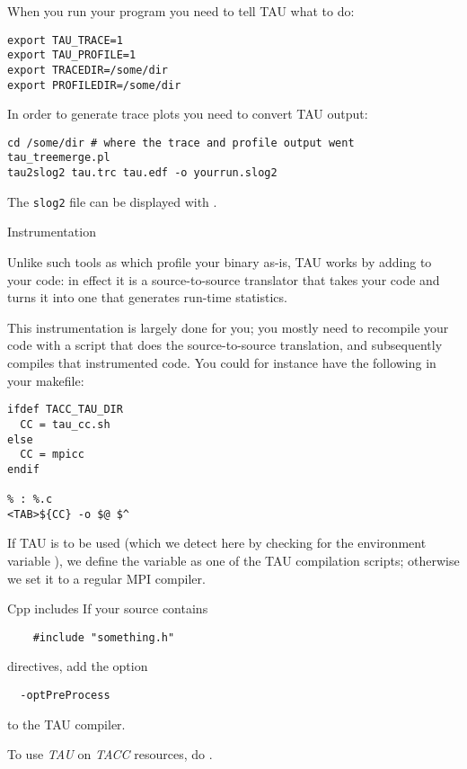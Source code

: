 When you run your program you need to tell TAU what to do:
\begin{verbatim}
export TAU_TRACE=1
export TAU_PROFILE=1
export TRACEDIR=/some/dir
export PROFILEDIR=/some/dir
\end{verbatim}

In order to generate trace plots you need to convert TAU output:
\begin{verbatim}
cd /some/dir # where the trace and profile output went
tau_treemerge.pl
tau2slog2 tau.trc tau.edf -o yourrun.slog2
\end{verbatim}

The \texttt{slog2} file can be displayed with .


 {Instrumentation}

Unlike such tools as  which profile your binary as-is,
TAU works by adding  to your code: in
effect it is a source-to-source translator that takes your code and
turns it into one that generates run-time statistics.

This instrumentation is largely done for you; you mostly need to recompile
your code with a script that does the source-to-source translation,
and subsequently compiles that instrumented code.
You could for instance have the following in your makefile:
\begin{verbatim}
ifdef TACC_TAU_DIR
  CC = tau_cc.sh
else
  CC = mpicc
endif

% : %.c
<TAB>${CC} -o $@ $^
\end{verbatim}
If TAU is to be used (which we detect here by checking for the environment variable
), we define the  variable as
one of the TAU compilation scripts; otherwise we set it to a regular MPI compiler.

\begin{fortrannote}{Cpp includes}
  If your source contains 
  \begin{lstlisting}
    #include "something.h" 
  \end{lstlisting}
  directives, add the option
\begin{verbatim}
  -optPreProcess
\end{verbatim}
to the TAU compiler.
\end{fortrannote}

\begin{istc}
To use \emph{TAU} on \emph{TACC} resources,
do .
\end{istc}

